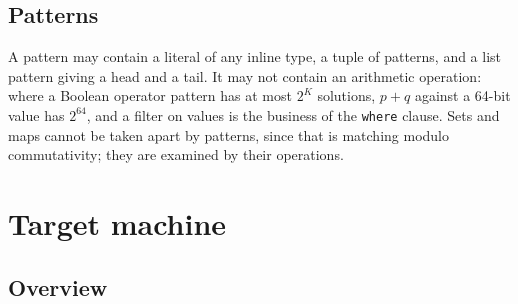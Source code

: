 \documentclass[11pt]{article}
\newcommand{\kw}[1]{\texttt{#1}}
\theoremstyle{definition}
\theoremstyle{remark}
\begin{document}
\subsection{Patterns}\label{sec:datapatterns}

A pattern may contain a literal of any inline type, a tuple of patterns, and
a list pattern giving a head and a tail. It may not contain an arithmetic
operation: where a Boolean operator pattern has at most $2^K$ solutions,
$p + q$ against a 64-bit value has $2^{64}$, and a filter on values is the
business of the \kw{where} clause. Sets and maps cannot be taken apart by
patterns, since that is matching modulo commutativity; they are examined by
their operations.

\section{Target machine}\label{sec:target}

\subsection{Overview}
\end{document}
